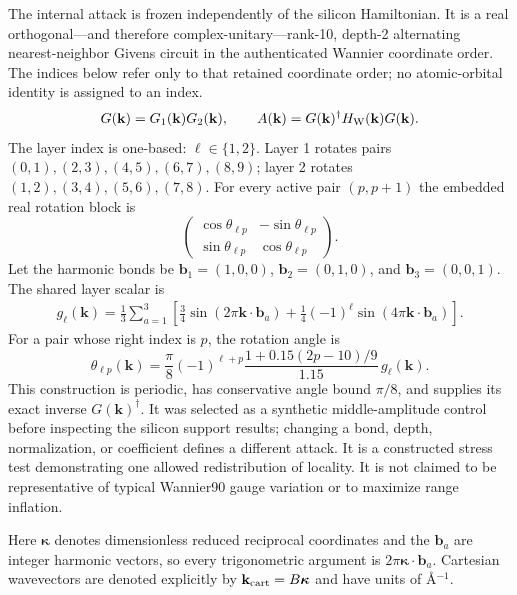 \documentclass[11pt]{article}
\theoremstyle{definition}
\newcommand{\kvec}{\mathbf k}
\begin{document}
The internal attack is frozen independently of the silicon Hamiltonian.  It is a real
orthogonal---and therefore complex-unitary---rank-10, depth-2 alternating
nearest-neighbor Givens circuit in the authenticated Wannier coordinate order.  The
indices below refer only to that retained coordinate order; no atomic-orbital identity
is assigned to an index.
\begin{equation}
 G(\kvec)=G_1(\kvec)G_2(\kvec),\qquad
 A(\kvec)=G(\kvec)^\dagger H_{\rm W}(\kvec)G(\kvec).
 \label{eq:rank10-attack}
\end{equation}
The layer index is one-based: $\ell\in\{1,2\}$.  Layer 1 rotates pairs
$(0,1),(2,3),(4,5),(6,7),(8,9)$; layer 2 rotates
$(1,2),(3,4),(5,6),(7,8)$.  For every active pair $(p,p+1)$ the embedded real rotation
block is
\begin{equation}
 \begin{pmatrix}\cos\theta_{\ell p}&-\sin\theta_{\ell p}\\
 \sin\theta_{\ell p}&\cos\theta_{\ell p}\end{pmatrix}.
\end{equation}
Let the harmonic bonds be
$\mathbf b_1=(1,0,0)$, $\mathbf b_2=(0,1,0)$, and
$\mathbf b_3=(0,0,1)$.  The shared layer scalar is
\begin{align}
 g_\ell(\kvec)=\frac{1}{3}\sum_{a=1}^{3}
 \left[\frac{3}{4}\sin(2\pi\kvec\cdot\mathbf b_a)
 +\frac{1}{4}(-1)^\ell\sin(4\pi\kvec\cdot\mathbf b_a)\right].
 \label{eq:gauge-scalar}
\end{align}
For a pair whose right index is $p$, the rotation angle is
\begin{equation}
 \theta_{\ell p}(\kvec)=\frac{\pi}{8}
 (-1)^{\ell+p}\frac{1+0.15(2p-10)/9}{1.15}\,g_\ell(\kvec).
 \label{eq:gauge-angle}
\end{equation}
This construction is periodic, has conservative angle bound $\pi/8$, and supplies its
exact inverse $G(\kvec)^\dagger$.  It was selected as a synthetic middle-amplitude
control before inspecting the silicon support results; changing a bond, depth,
normalization, or coefficient defines a different attack.  It is a constructed stress
test demonstrating one allowed redistribution of locality.  It is not claimed to be
representative of typical Wannier90 gauge variation or to maximize range inflation.

Here $\boldsymbol\kappa$ denotes dimensionless reduced reciprocal coordinates and the
$\mathbf b_a$ are integer harmonic vectors, so every trigonometric argument is
$2\pi\boldsymbol\kappa\cdot\mathbf b_a$.  Cartesian wavevectors are denoted explicitly
by $\mathbf k_{\rm cart}=B\boldsymbol\kappa$ and have units of \AA$^{-1}$.
\end{document}
